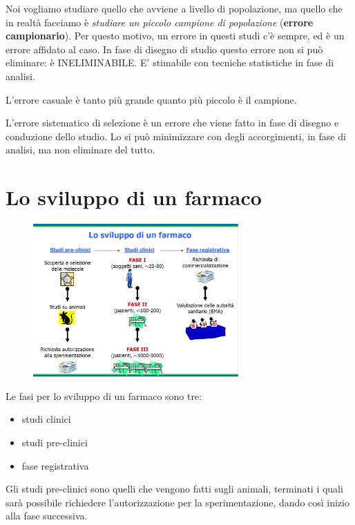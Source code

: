 Noi vogliamo studiare quello che avviene a livello di popolazione, ma
quello che in realtà facciamo è \emph{studiare un piccolo campione di
popolazione} (\textbf{errore campionario}). Per questo motivo, un errore
in questi studi c'è sempre, ed è un errore affidato al caso. In fase di
disegno di studio questo errore non si può eliminare: è INELIMINABILE.
E' stimabile con tecniche statistiche in fase di analisi.

L'errore casuale è tanto più grande quanto più piccolo è il campione.

L'errore sistematico di selezione è un errore che viene fatto in fase di
disegno e conduzione dello studio. Lo si può minimizzare con degli
accorgimenti, in fase di analisi, ma non eliminare del tutto.

\section{Lo sviluppo di un farmaco}

\begin{figure}[!ht]
\centering
\includegraphics[width=0.7\textwidth]{05/image10.png}
\end{figure}

Le fasi per lo sviluppo di un farmaco sono tre:

\begin{itemize}
\item
  studi clinici
\item
  studi pre-clinici
\item
  fase registrativa
\end{itemize}

Gli studi pre-clinici sono quelli che vengono fatti sugli animali,
terminati i quali sarà possibile richiedere l'autorizzazione per la
sperimentazione, dando così inizio alla fase successiva.

